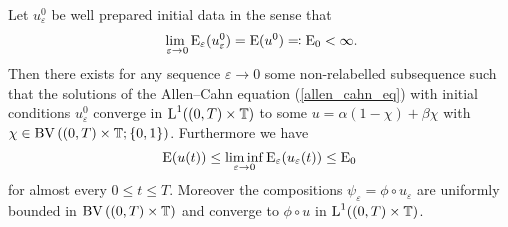 \begin{proposition}
	\label{initial_convergence_result}
	Let $ u_{ \varepsilon }^{ 0 } $ be well prepared initial data in the sense 
	that
	\begin{equation}
		\lim_{ \ \varepsilon \to 0 }
		\operatorname{E}_{ \varepsilon } ( u_{ \varepsilon }^{ 0 } ) 
		=
		\operatorname{E} ( u^{ 0 } )
		\eqqcolon 
		\operatorname{E}_{ 0 }
		<
		\infty.
	\end{equation}
	Then there exists for any sequence $ \varepsilon \to 0 $ some 
	non-relabelled subsequence such that the solutions of the Allen--Cahn 
	equation (\ref{allen_cahn_eq}) with initial conditions $ u_{ \varepsilon 
	}^{ 0 } $ converge in $ \operatorname{L}^{ 1 } ( ( 0, T ) \times \operatorname{\mathbb{T}} ) $ to some 
	$ u = \alpha ( 1 - \chi ) + \beta \chi $ with $ \chi \in \operatorname{BV} \left( ( 0 , T 
	) \times \operatorname{\mathbb{T}} ; \{ 0 , 1 \} \right) $.
	Furthermore we have
	\begin{equation*}
		\operatorname{E} ( u ( t ) ) 
		\leq
		\liminf_{ \varepsilon \to 0 }
			\operatorname{E}_{ \varepsilon } ( u_{ \varepsilon } ( t ) )
		\leq 
		\operatorname{E}_{ 0 }
	\end{equation*}
	for almost every $ 0 \leq t \leq T $. Moreover the compositions $ \psi_{ 
	\varepsilon } = \phi \circ u_{ \varepsilon } $ are uniformly bounded in $ 
	\operatorname{BV} \left( ( 0, T ) \times 
	\operatorname{\mathbb{T}} \right) $ and converge to $ \phi \circ u $ in $ \operatorname{L}^{ 1 } ( ( 0 
	, T ) \times \operatorname{\mathbb{T}} ) $.
\end{proposition}


